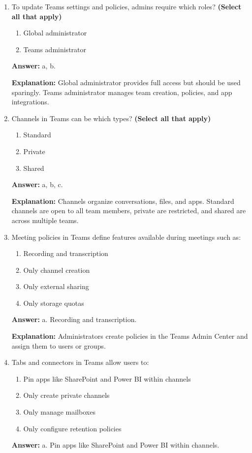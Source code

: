 \documentclass[10pt]{article}
\begin{document}
\begin{enumerate}[leftmargin=*]
\textbf{Explanation:} This integration provides a seamless experience for chat, meetings, calls, and app integrations.

\item To update Teams settings and policies, admins require which roles? \textbf{(Select all that apply)}
\begin{enumerate}[label=\alph*., leftmargin=1.5em]
\item Global administrator
\item Teams administrator
\end{enumerate}
\textbf{Answer:} a, b.

\textbf{Explanation:} Global administrator provides full access but should be used sparingly. Teams administrator manages team creation, policies, and app integrations.

\item Channels in Teams can be which types? \textbf{(Select all that apply)}
\begin{enumerate}[label=\alph*., leftmargin=1.5em]
\item Standard
\item Private
\item Shared
\end{enumerate}
\textbf{Answer:} a, b, c.

\textbf{Explanation:} Channels organize conversations, files, and apps. Standard channels are open to all team members, private are restricted, and shared are across multiple teams.

\item Meeting policies in Teams define features available during meetings such as:
\begin{enumerate}[label=\alph*., leftmargin=1.5em]
\item Recording and transcription
\item Only channel creation
\item Only external sharing
\item Only storage quotas
\end{enumerate}
\textbf{Answer:} a. Recording and transcription.

\textbf{Explanation:} Administrators create policies in the Teams Admin Center and assign them to users or groups.

\item Tabs and connectors in Teams allow users to:
\begin{enumerate}[label=\alph*., leftmargin=1.5em]
\item Pin apps like SharePoint and Power BI within channels
\item Only create private channels
\item Only manage mailboxes
\item Only configure retention policies
\end{enumerate}
\textbf{Answer:} a. Pin apps like SharePoint and Power BI within channels.


\end{enumerate}
\end{document}
